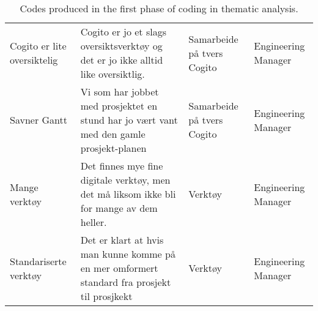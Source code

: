 \begin{table}[]
{\begin{tabular}{@{}llll@{}}
    Cogito er lite oversiktelig & Cogito er jo et slags oversiktsverktøy og det er jo ikke alltid like oversiktlig. & Samarbeide på tvers Cogito & Engineering Manager \\
    Savner Gantt & Vi som har jobbet med prosjektet en stund har jo vært vant med den gamle prosjekt-planen & Samarbeide på tvers Cogito & Engineering Manager \\
    Mange verktøy & Det finnes mye fine digitale verktøy, men det må liksom ikke bli for mange av dem heller. & Verktøy & Engineering Manager \\
    Standariserte verktøy & Det er klart at hvis man kunne komme på en mer omformert standard fra prosjekt til prosjkekt & Verktøy & Engineering Manager \\ \bottomrule
    \end{tabular}%
    }
    \caption{Codes produced in the first phase of coding in thematic analysis.}
    \label{tab:codes}
    \end{table}